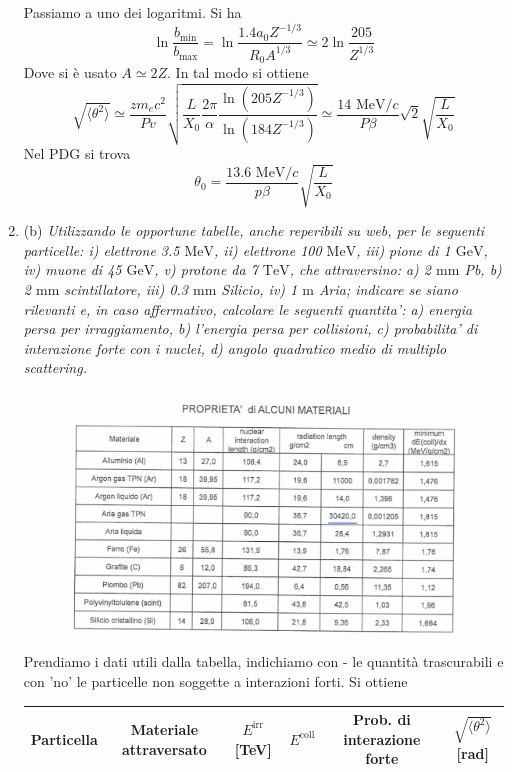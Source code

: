 \documentclass{article}
\renewcommand{\b}{(b)}
\renewcommand{\t}[1]{\textit{ #1}}
\begin{document}
\begin{enumerate}
	Passiamo a uno dei logaritmi. Si ha
	\[\ln\frac{b_\textrm{min}}{b_\textrm{max}}=\ln\frac{1.4a_0Z^{-1/3}}{R_0A^{1/3}}\simeq2\ln\frac{205}{Z^{1/3}}\]
	Dove si è usato $A\simeq 2Z$. In tal modo si ottiene
	\[\sqrt{\langle\theta^2\rangle}\simeq\frac{zm_ec^2}{Pv}\sqrt{\frac{L}{X_0}\frac{2\pi}{\alpha}\frac{\ln(205Z^{-1/3})}{\ln(184Z^{-1/3})}}\simeq\frac{14\textrm{ MeV/}c}{P\beta}\sqrt{2}\sqrt{\frac{L}{X_0}}\]
	Nel PDG si trova
	\[\theta_0=\frac{13.6\textrm{ MeV/}c}{p\beta}\sqrt{\frac{L}{X_0}}\]
	\item\b\t{Utilizzando le opportune tabelle, anche reperibili su web, per le seguenti
		particelle: i) elettrone 3.5 $\mathrm{MeV}$, ii) elettrone 100 $\mathrm{MeV}$, iii) pione di 1 $\mathrm{GeV}$, iv)
		muone di 45 $\mathrm{GeV}$, v) protone da 7 $\mathrm{TeV}$, che attraversino: a) 2 $\mathrm{mm}$ Pb, b) 2
		$\mathrm{mm}$ scintillatore, iii) 0.3 $\mathrm{mm}$ Silicio, iv) 1 $\mathrm{m}$ Aria; indicare se siano rilevanti
		e, in caso affermativo, calcolare le seguenti quantita': a) energia persa per
		irraggiamento, b) l’energia persa per collisioni, c) probabilita' di interazione
		forte con i nuclei, d) angolo quadratico medio di multiplo scattering.}
	\begin{figure}
		\centering
		\includegraphics[scale=0.5]{salvavita.png}
	\end{figure}
	Prendiamo i dati utili dalla tabella, indichiamo con - le quantità trascurabili e con 'no' le particelle non soggette a interazioni forti. Si ottiene
	\begin{center}
	\begin{tabular}{c | c | c c c c}
		Particella&Materiale attraversato&$E^\textrm{irr}$ [TeV]&$E^\textrm{coll}$&Prob. di interazione forte&$\sqrt{\langle\theta^2\rangle}$ [rad]\\\hline

\end{tabular}
\end{center}
\end{enumerate}
\end{document}
